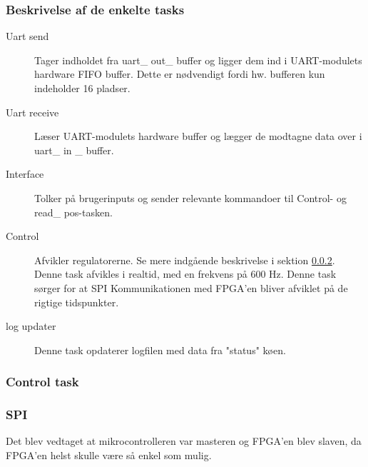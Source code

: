 \subsubsection{Beskrivelse af de enkelte tasks}
\begin{description}
	\item[Uart send] Tager indholdet fra uart\_ out\_ buffer og ligger dem ind i UART-modulets hardware FIFO buffer. Dette er nødvendigt fordi hw. bufferen kun indeholder 16 pladser. \citep[Side. 430]{lm3s6965}
	\item[Uart receive] Læser UART-modulets hardware buffer og lægger de modtagne data over i uart\_ in \_ buffer. 
	\item[Interface] Tolker på brugerinputs og sender relevante kommandoer til Control- og read\_ pos-tasken.
	\item[Control] Afvikler regulatorerne. Se mere indgående beskrivelse i sektion \ref{sec:control_task}. Denne task afvikles i realtid, med en frekvens på 600 Hz. 
	Denne task sørger for at SPI Kommunikationen med FPGA'en bliver afviklet på de rigtige tidspunkter.
	\item[log updater] Denne task opdaterer logfilen  med data fra "status" køen.
\end{description}




\subsubsection{Control task}
\label{sec:control_task}

\subsubsection{SPI}
\label{sec:spi-implementering}
Det blev vedtaget at mikrocontrolleren var masteren og FPGA'en blev slaven, da FPGA'en helst skulle være så enkel som mulig.

